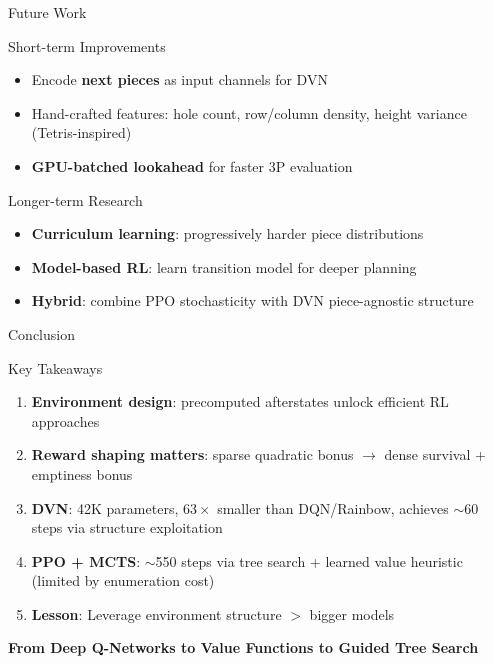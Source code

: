 \documentclass[aspectratio=169,10pt]{beamer}
\begin{document}
\begin{frame}{Future Work}
\begin{block}{Short-term Improvements}
\begin{itemize}
    \item Encode \textbf{next pieces} as input channels for DVN
    \item Hand-crafted features: hole count, row/column density, height variance (Tetris-inspired)
    \item \textbf{GPU-batched lookahead} for faster 3P evaluation
\end{itemize}
\end{block}

\vspace{0.5em}
\begin{block}{Longer-term Research}
\begin{itemize}
    \item \textbf{Curriculum learning}: progressively harder piece distributions
    \item \textbf{Model-based RL}: learn transition model for deeper planning
    \item \textbf{Hybrid}: combine PPO stochasticity with DVN piece-agnostic structure
\end{itemize}
\end{block}
\end{frame}

\begin{frame}{Conclusion}
\begin{block}{Key Takeaways}
\begin{enumerate}
    \item \textbf{Environment design}: precomputed afterstates unlock efficient RL approaches
    
    \vspace{0.3em}
    \item \textbf{Reward shaping matters}: sparse quadratic bonus $\to$ dense survival + emptiness bonus
    
    \vspace{0.3em}
    \item \textbf{DVN}: 42K parameters, $63\times$ smaller than DQN/Rainbow, achieves $\sim$60 steps via structure exploitation
    
    \vspace{0.3em}
    \item \textbf{PPO + MCTS}: $\sim$550 steps via tree search + learned value heuristic (limited by enumeration cost)
    
    \vspace{0.3em}
    \item \textbf{Lesson}: Leverage environment structure $>$ bigger models
\end{enumerate}
\end{block}

\vspace{0.8em}
\centering
\normalsize
\textbf{From Deep Q-Networks to Value Functions to Guided Tree Search}
\end{frame}
\end{document}

